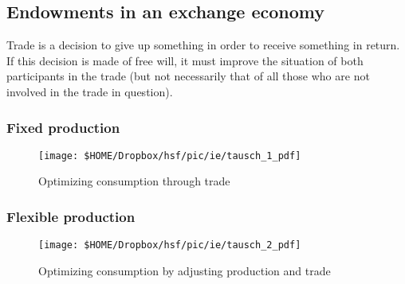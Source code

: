 {	
	
	
	
	\pbn
	\subsection{Endowments in an exchange economy}
	
	
	Trade is a decision to give up something in order to receive something in return. If this decision is made of free will, it must improve the situation of both participants in the trade (but not necessarily that of all those who are not involved in the trade in question).		
	
	\subsubsection{Fixed production}
	\begin{figure}
		\begin{center}
			\texttt{[image: \$HOME/Dropbox/hsf/pic/ie/tausch\_1\_pdf]}
			\caption{Optimizing consumption through trade}\label{fig:tausch_1}
		\end{center}
	
	\end{figure}
	
	\pbn	
	\subsubsection{Flexible production}
	\begin{figure}
		\begin{center}
			\texttt{[image: \$HOME/Dropbox/hsf/pic/ie/tausch\_2\_pdf]}
			\caption{Optimizing consumption by adjusting production and trade }\label{fig:tausch_2}
		\end{center}
	

\end{figure}}
